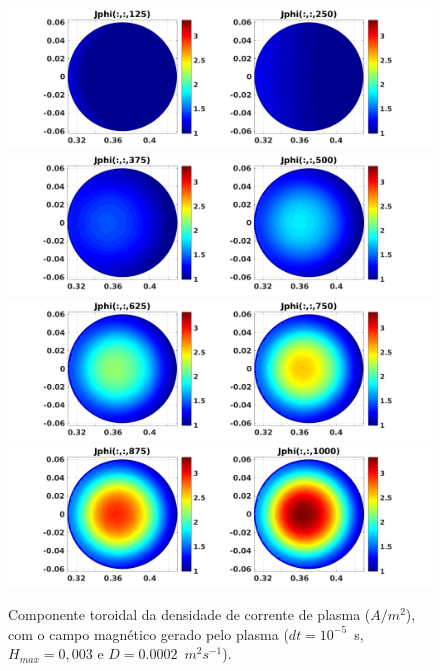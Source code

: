 \documentclass[12pt,oneside,a4paper]{abntex2}
\begin{document}
\begin{figure}[H]
\centering
\includegraphics[scale=0.5]{../SImulacao_breakdown/PDE/Jphitod1B1.png}  
\includegraphics[scale=0.5]{../SImulacao_breakdown/PDE/Jphitod2B1.png} 
\includegraphics[scale=0.5]{../SImulacao_breakdown/PDE/Jphitod3B1.png} 
\includegraphics[scale=0.5]{../SImulacao_breakdown/PDE/Jphitod4B1.png} 
\caption{Componente toroidal da densidade de corrente de plasma ($A/m^2$), com o campo magnético gerado pelo plasma ($dt=10^{-5}$\ s, $H_{max} = 0,003$ e $D=0.0002$\ $m^2s^{-1}$).}
\label{campplasmasi2l2}
\end{figure}
\end{document}
